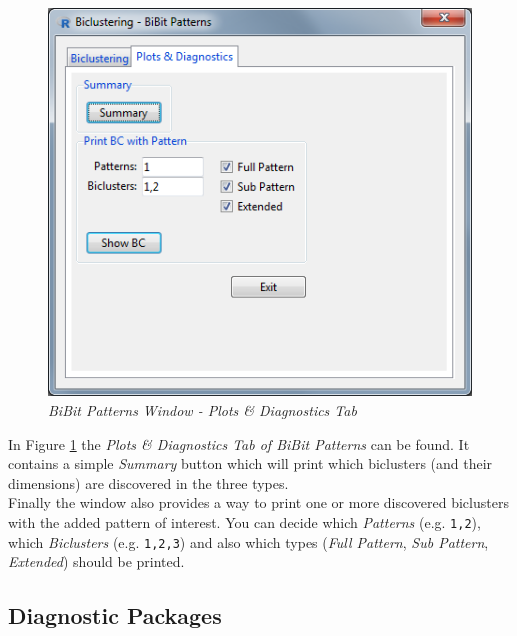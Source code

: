 \documentclass[a4paper]{article}\usepackage[]{graphicx}\usepackage[]{color}
\begin{document}
\begin{figure}[H]
\centering
\includegraphics[scale=0.5]{figures/bibit3_plotdiagtab.png}
\caption{{\it BiBit Patterns Window - Plots \& Diagnostics Tab}\label{bibit3_plotdiagtab}}
\end{figure}

\noindent In Figure \ref{bibit3_plotdiagtab} the {\it Plots \& Diagnostics Tab
of BiBit Patterns} can be found. It contains a simple {\it Summary} button which will
print which biclusters (and their dimensions) are discovered in the three
types.\\
Finally the window also provides a way to print one or more discovered
biclusters with the added pattern of interest. You can decide which {\it
Patterns} (e.g. \texttt{1,2}), which {\it Biclusters} (e.g. \texttt{1,2,3}) and
also which types ({\it Full Pattern}, {\it Sub Pattern}, {\it Extended}) should
be printed.

\subsection{Diagnostic Packages}
\end{document}
